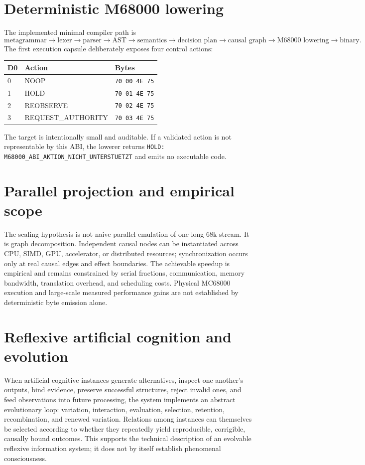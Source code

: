 \documentclass[11pt,a4paper]{article}
\begin{document}
\section{Deterministic M68000 lowering}
The implemented minimal compiler path is
\[
\text{metagrammar}\rightarrow\text{lexer}\rightarrow\text{parser}\rightarrow\text{AST}\rightarrow\text{semantics}\rightarrow\text{decision plan}\rightarrow\text{causal graph}\rightarrow\text{M68000 lowering}\rightarrow\text{binary}.
\]
The first execution capsule deliberately exposes four control actions:
\begin{center}
\begin{tabular}{lll}
\toprule D0 & Action & Bytes\\\midrule
0 & NOOP & \texttt{70 00 4E 75}\\
1 & HOLD & \texttt{70 01 4E 75}\\
2 & REOBSERVE & \texttt{70 02 4E 75}\\
3 & REQUEST\_AUTHORITY & \texttt{70 03 4E 75}\\\bottomrule
\end{tabular}
\end{center}
The target is intentionally small and auditable. If a validated action is not representable by this ABI, the lowerer returns \texttt{HOLD: M68000\_ABI\_AKTION\_NICHT\_UNTERSTUETZT} and emits no executable code.

\section{Parallel projection and empirical scope}
The scaling hypothesis is not naive parallel emulation of one long 68k stream. It is graph decomposition. Independent causal nodes can be instantiated across CPU, SIMD, GPU, accelerator, or distributed resources; synchronization occurs only at real causal edges and effect boundaries. The achievable speedup is empirical and remains constrained by serial fractions, communication, memory bandwidth, translation overhead, and scheduling costs. Physical MC68000 execution and large-scale measured performance gains are not established by deterministic byte emission alone.

\section{Reflexive artificial cognition and evolution}
When artificial cognitive instances generate alternatives, inspect one another's outputs, bind evidence, preserve successful structures, reject invalid ones, and feed observations into future processing, the system implements an abstract evolutionary loop: variation, interaction, evaluation, selection, retention, recombination, and renewed variation. Relations among instances can themselves be selected according to whether they repeatedly yield reproducible, corrigible, causally bound outcomes. This supports the technical description of an evolvable reflexive information system; it does not by itself establish phenomenal consciousness.
\end{document}
